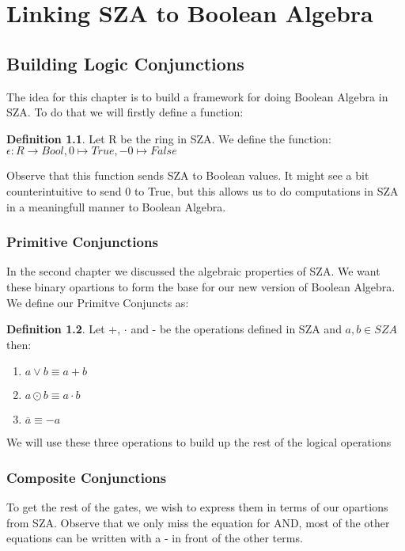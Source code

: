 \documentclass[12pt]{report}
\theoremstyle{definition}
\newtheorem{definition}{Definition}[section]
\theoremstyle{remark}
\begin{document}
\chapter{Linking SZA to Boolean Algebra}
  \section{Building Logic Conjunctions}
    The idea for this chapter is to build a framework for doing Boolean Algebra in SZA. To do that we will firstly define a function:

    \begin{definition}
      Let R be the ring in SZA. We define the function:\\ $\epsilon: R \rightarrow Bool, 0\mapsto True, -0\mapsto False$
    \end{definition}

    Observe that this function sends SZA to Boolean values. It might see a bit counterintuitive to send 0 to True, but this allows us to do computations in SZA in a meaningfull manner to Boolean Algebra.

    \subsection{Primitive Conjunctions}
      In the second chapter we discussed the algebraic properties of SZA. We want these binary opartions to form the base for our new version of Boolean Algebra. We define our Primitve Conjuncts as:

      \begin{definition}
        Let +, $\cdot$ and - be the operations defined in SZA and $a,b\in SZA$ then:
        \begin{enumerate}
          \item $a\vee b\equiv a+b$
          \item $a\odot b\equiv a\cdot b$
          \item  $\overline{a}\equiv -a$
        \end{enumerate}
      \end{definition}

      We will use these three operations to build up the rest of the logical operations

    \newpage

    \subsection{Composite Conjunctions}
      To get the rest of the gates, we wish to express them in terms of our opartions from SZA. Observe that we only miss the equation for AND, most of the other equations can be written with a - in front of the other terms.
\end{document}
